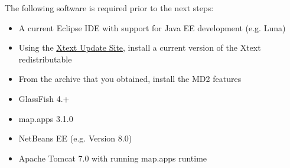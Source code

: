 


The following software is required prior to the next steps:

\begin{itemize}
\item A current Eclipse IDE with support for Java EE development (e.g. Luna)
\item Using the \href{https://eclipse.org/Xtext/download.html}{Xtext Update Site}, install a current version of the Xtext redistributable
\item From the archive that you obtained, install the MD2 features
\item GlassFish 4.+
\item map.apps 3.1.0
\item NetBeans EE (e.g. Version 8.0)
\item Apache Tomcat 7.0 with running map.apps runtime 
\end{itemize}





